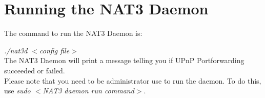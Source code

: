 \section{Running the NAT3 Daemon}

The command to run the NAT3 Daemon is:

\textit{./nat3d $<$config file$>$}\\

The NAT3 Daemon will print a message telling you if UPnP Portforwarding succeeded or failed. \\

Please note that you need to be administrator use to run the daemon. To do this, use \textit{sudo $<$NAT3 daemon run command$>$}.
